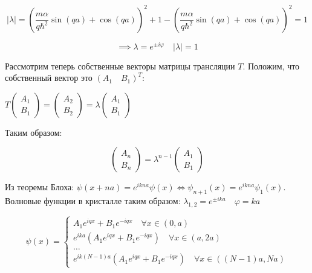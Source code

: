 \documentclass[a4paper, 12pt]{article}
\begin{document}
	\begin{equation}
		|\lambda| = \left(\dfrac{m\alpha}{q\hbar^2} \sin(qa) + \cos(qa)\right)^2 + 1 - \left(\dfrac{m\alpha}{q\hbar^2} \sin(qa) + \cos(qa)\right)^2 = 1
	\end{equation}
	
	\begin{equation}
		\implies \lambda = e^{\pm i\varphi} \quad |\lambda| = 1
	\end{equation}
	
	\quad Рассмотрим теперь собственные векторы матрицы трансляции $T$. Положим, что собственный вектор это $\left( A_1  \quad B_1 \right)^{T}$:
	
	\begin{center}
		$T\left(\begin{array}{c}
			A_1 \\
			B_1
		\end{array}\right) = \left(\begin{array}{c}
			A_2 \\
			B_2
		\end{array}\right) = \lambda\left(\begin{array}{c}
			A_1 \\
			B_1 
		\end{array}\right)$
	\end{center} 
	
	\quad Таким образом:
	
	\begin{equation}
		\left(\begin{array}{c}
			A_n \\
			B_n
		\end{array}\right) = \lambda^{n-1}\left(\begin{array}{c}
			A_1 \\
			B_1 
		\end{array}\right)
	\end{equation}
	
	\quad Из теоремы Блоха: $\psi(x+na) = e^{ikna} \psi(x) \Leftrightarrow \psi_{n+1} (x) = e^{ikna} \psi_1 (x) $.
	Волновые функции в кристалле таким образом: $\lambda_{1,2} = e^{\pm ika} \quad \varphi = ka$
	
	\begin{equation}
		\psi(x) = \begin{cases}
			A_1 e^{iqx} + B_1 e^{-iqx} \quad \forall x \in (0, a)\\
			e^{ika} \left(A_1 e^{iqx} + B_1 e^{-iqx} \right) \quad \forall x \in (a, 2a) \\
			\dots\\
			e^{ik(N-1)a} \left(A_1 e^{iqx} + B_1 e^{-iqx} \right) \quad \forall x \in ((N-1)a, Na)  
		\end{cases}
	\end{equation}
	
\end{document}
